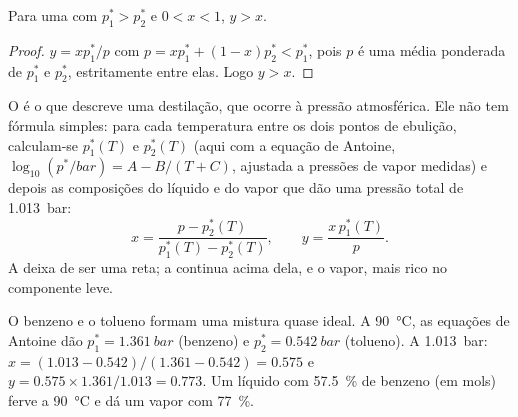 \begin{proposition}\label{prop:b2:liquid-vapour-diagrams:richer}
Para uma  com $p_1^* > p_2^*$ e $0 < x < 1$, $y > x$.
\end{proposition}

\begin{proof}
$y = xp_1^*/p$ com $p = xp_1^* + (1 - x)p_2^* < p_1^*$, pois $p$ é uma
média ponderada de $p_1^*$ e $p_2^*$, estritamente entre elas. Logo $y >
x$.
\end{proof}

O  é o que descreve uma destilação, que ocorre à pressão
atmosférica. Ele não tem fórmula simples: para cada temperatura entre os
dois pontos de ebulição, calculam-se $p_1^*(T)$ e $p_2^*(T)$ (aqui com a
equação de Antoine, $\log_{10}(p^*/\unit{bar}) = A - B/(T + C)$, ajustada a
pressões de vapor medidas) e depois as composições do líquido e do vapor que
dão uma pressão total de \qty{1.013}{bar}:
\[
  x = \frac{p - p_2^*(T)}{p_1^*(T) - p_2^*(T)}, \qquad y = \frac{x\,p_1^*(T)}{p} .
\]
A  deixa de ser uma reta; a  continua acima
dela, e o vapor, mais rico no componente leve.

\begin{example}\label{ex:b2:liquid-vapour-diagrams:benzene-toluene}
O benzeno e o tolueno formam uma mistura quase ideal. A \qty{90}{\degreeCelsius},
as equações de Antoine dão $p_1^* = \qty{1.361}{bar}$ (benzeno) e $p_2^* =
\qty{0.542}{bar}$ (tolueno). A \qty{1.013}{bar}: $x = (1.013 - 0.542)/(1.361 -
0.542) = 0.575$ e $y = 0.575 \times 1.361/1.013 = 0.773$. Um líquido com 57.5~\%
de benzeno (em mols) ferve a \qty{90}{\degreeCelsius} e dá um vapor com
77~\%.
\end{example}

